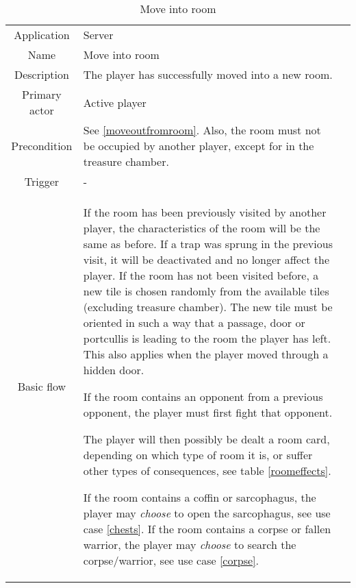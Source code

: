 \begin{table}
\caption{Move into room}
\label{moveintoroom}
\begin{tabular}{|c| p{9cm}|c}
\hline
Application & Server & \\
Name & Move into room & \\
Description & The player has successfully moved into a new room. & \\
Primary actor & Active player & \\
Precondition & See \ref{moveoutfromroom}. Also, the room must not be occupied by another player, except for in the treasure chamber. & \\
Trigger & - & \\ \hline
Basic flow & If the room has been previously visited by another player, the characteristics of the room will be the same as before. If a trap was sprung in the previous visit, it will be deactivated and no longer affect the player. If the room has not been visited before, a new tile is chosen randomly from the available tiles (excluding treasure chamber). The new tile must be oriented in such a way that a passage, door or portcullis is leading to the room the player has left. This also applies when the player moved through a hidden door.

If the room contains an opponent from a previous opponent, the player must first fight that opponent.

The player will then possibly be dealt a room card, depending on which type of room it is, or suffer other types of consequences, see table \ref{roomeffects}.

If the room contains a coffin or sarcophagus, the player may \emph{choose} to open the sarcophagus, see use case \ref{chests}. If the room contains a corpse or fallen warrior, the player may \emph{choose} to search the corpse/warrior, see use case \ref{corpse}.

& \\ \hline
\end{tabular}
\end{table}


